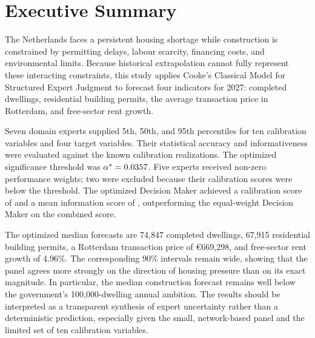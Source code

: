 \chapter*{Executive Summary}

The Netherlands faces a persistent housing shortage while construction is constrained by permitting delays, labour scarcity, financing costs, and environmental limits. Because historical extrapolation cannot fully represent these interacting constraints, this study applies Cooke's Classical Model for Structured Expert Judgment to forecast four indicators for 2027: completed dwellings, residential building permits, the average transaction price in Rotterdam, and free-sector rent growth.

Seven domain experts supplied 5th, 50th, and 95th percentiles for ten calibration variables and four target variables. Their statistical accuracy and informativeness were evaluated against the known calibration realizations. The optimized significance threshold was $\alpha^*=0.0357$. Five experts received non-zero performance weights; two were excluded because their calibration scores were below the threshold. The optimized Decision Maker achieved a calibration score of \OptimizedDMCalibration{} and a mean information score of \OptimizedDMInformation{}, outperforming the equal-weight Decision Maker on the combined score.

The optimized median forecasts are 74,847 completed dwellings, 67,915 residential building permits, a Rotterdam transaction price of \euro669,298, and free-sector rent growth of 4.96\%. The corresponding 90\% intervals remain wide, showing that the panel agrees more strongly on the direction of housing pressure than on its exact magnitude. In particular, the median construction forecast remains well below the government's 100,000-dwelling annual ambition. The results should be interpreted as a transparent synthesis of expert uncertainty rather than a deterministic prediction, especially given the small, network-based panel and the limited set of ten calibration variables.
